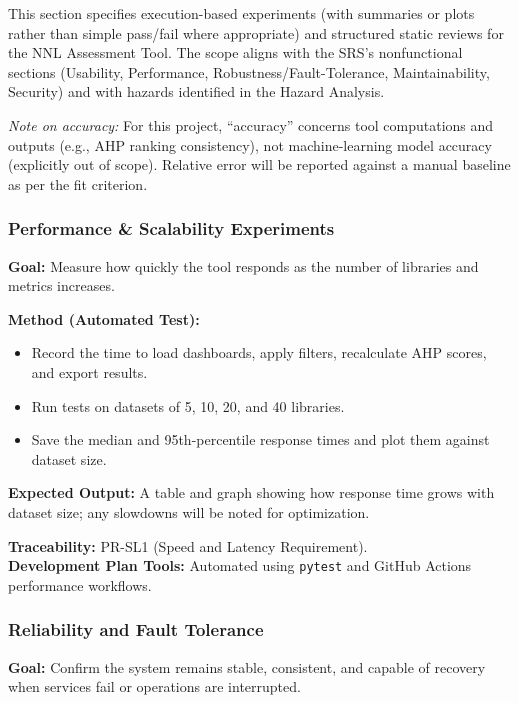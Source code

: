 \documentclass[12pt, titlepage]{article}
\begin{document}
This section specifies execution-based experiments (with summaries or plots rather than simple pass/fail where appropriate) and structured static reviews for the NNL Assessment Tool. The scope aligns with the SRS’s nonfunctional sections (Usability, Performance, Robustness/Fault-Tolerance, Maintainability, Security) and with hazards identified in the Hazard Analysis.

\textit{Note on accuracy:} For this project, ``accuracy'' concerns tool computations and outputs (e.g., AHP ranking consistency), not machine-learning model accuracy (explicitly out of scope). Relative error will be reported against a manual baseline as per the fit criterion.

\subsubsection{Performance \& Scalability Experiments}
\label{subsubsec:performance}

\textbf{Goal:} Measure how quickly the tool responds as the number of libraries and metrics increases.

\textbf{Method (Automated Test):}
\begin{itemize}
  \item Record the time to load dashboards, apply filters, recalculate AHP scores, and export results.
  \item Run tests on datasets of 5, 10, 20, and 40 libraries.
  \item Save the median and 95th-percentile response times and plot them against dataset size.
\end{itemize}

\textbf{Expected Output:} A table and graph showing how response time grows with dataset size; any slowdowns will be noted for optimization.

\textbf{Traceability:} PR-SL1 (Speed and Latency Requirement).\\
\textbf{Development Plan Tools:} Automated using \texttt{pytest} and GitHub Actions performance workflows.

\subsubsection{Reliability and Fault Tolerance}
\label{subsubsec:reliability}

\textbf{Goal:} Confirm the system remains stable, consistent, and capable of recovery when services fail or operations are interrupted.
\end{document}
